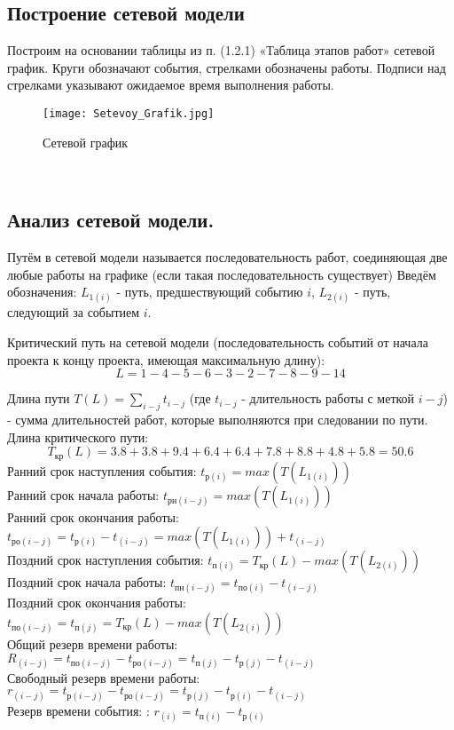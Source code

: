 \subsection{Построение сетевой модели}

Построим на основании таблицы из п. (1.2.1) «Таблица этапов работ» сетевой график. Круги обозначают события, стрелками обозначены работы. Подписи над стрелками указывают ожидаемое время выполнения работы.
\\
\begin{figure}[ht!]
\centering \texttt{[image: Setevoy\_Grafik.jpg]}
\caption{Сетевой график}
\end{figure}
\\
\subsection{Анализ сетевой модели.}

Путём в сетевой модели называется последовательность работ, соединя\-ющая две любые работы на графике (если такая последовательность сущест\-вует)
Введём обозначения: $L_{1(i)}$ - путь, предшествующий событию $i$, $L_{2(i)}$ - путь, следующий за событием $i$.

Критический путь на сетевой модели (последовательность событий от начала проекта к концу проекта, имеющая максимальную длину):
$$
L = 1-4-5-6-3-2-7-8-9-14
$$

Длина пути $T(L) = \sum\limits_{i-j}t_{i-j}$ (где $t_{i-j}$ - длительность работы с меткой $i-j$) - сумма длительностей работ, которые выполняются при следовании по пути. Длина критического пути:
$$
T_{\mbox{кр}}(L) = 3.8+3.8+9.4+6.4+6.4+7.8+8.8+4.8+5.8 = 50.6
$$
Ранний срок наступления события: $t_{\mbox{р}(i)} = max(T(L_{1(i)}))$\\
Ранний срок начала работы: $t_{\mbox{рн}(i-j)} = max(T(L_{1(i)}))$\\
Ранний срок окончания работы: $t_{\mbox{ро}(i-j)}= t_{\mbox{р}(i)} - t_{(i-j)} = max(T(L_{1(i)})) + t_{(i-j)} $\\
Поздний срок наступления события: $t_{\mbox{п}(i)}= T_{\mbox{кр}}(L) -  max(T(L_{2(i)}))$\\
Поздний срок начала работы: $t_{\mbox{пн}(i-j)}= t_{\mbox{по}(i)} - t_{(i-j)}$\\
Поздний срок окончания работы: $t_{\mbox{по}(i-j)} = t_{\mbox{п}(j)}= T_{\mbox{кр}}(L) -  max(T(L_{2(i)}))$\\
Общий резерв времени работы: $R_{(i-j)} = t_{\mbox{по}(i-j)} - t_{\mbox{ро}(i-j)} =  t_{\mbox{п}(j)} -  t_{\mbox{р}(j)} -  t_{(i-j)}$\\
Свободный резерв времени работы: $r_{(i-j)} = t_{\mbox{р}(i-j)} - t_{\mbox{ро}(i-j)} =  t_{\mbox{р}(j)} -  t_{\mbox{р}(i)} -  t_{(i-j)}$\\
Резерв времени события: : $r_{(i)} = t_{\mbox{п}(i)} - t_{\mbox{р}(i)} $

